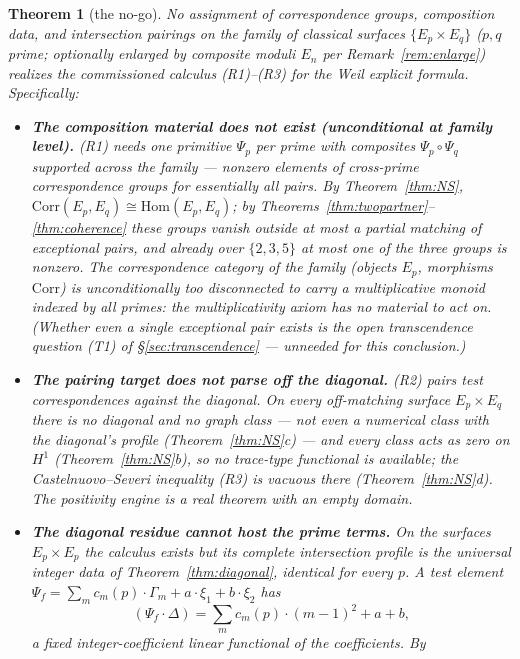 \documentclass[11pt]{article}
\newtheorem{theorem}{Theorem}
\theoremstyle{definition}
\theoremstyle{remark}
\newcommand{\Hom}{\mathrm{Hom}}
\newcommand{\Corr}{\mathrm{Corr}}
\begin{document}
\begin{theorem}[the no-go]
\label{thm:nogo}
No assignment of correspondence groups, composition data, and intersection
pairings on the family of classical surfaces $\{E_p \times E_q\}$ ($p, q$
prime; optionally enlarged by composite moduli $E_n$ per
Remark~\ref{rem:enlarge}) realizes the commissioned calculus
\textup{(R1)}--\textup{(R3)} for the Weil explicit formula. Specifically:
\begin{itemize}
\item[\textup{(O1)}] \textbf{The composition material does not exist
(unconditional at family level).} \textup{(R1)} needs one primitive $\Psi_p$
per prime with composites $\Psi_p \circ \Psi_q$ supported across the
family --- nonzero elements of cross-prime correspondence groups for
essentially all pairs. By Theorem~\ref{thm:NS},
$\Corr(E_p, E_q) \cong \Hom(E_p, E_q)$; by
Theorems~\ref{thm:twopartner}--\ref{thm:coherence} these groups vanish
outside at most a partial matching of exceptional pairs, and already over
$\{2,3,5\}$ at most one of the three groups is nonzero. The correspondence
category of the family (objects $E_p$, morphisms $\Corr$) is unconditionally
too disconnected to carry a multiplicative monoid indexed by all primes: the
multiplicativity axiom has no material to act on. (Whether even a single
exceptional pair exists is the open transcendence question (T1) of
\S\ref{sec:transcendence} --- unneeded for this conclusion.)
\item[\textup{(O2)}] \textbf{The pairing target does not parse off the
diagonal.} \textup{(R2)} pairs test correspondences against the diagonal. On
every off-matching surface $E_p \times E_q$ there is no diagonal and no
graph class --- not even a numerical class with the diagonal's profile
(Theorem~\ref{thm:NS}c) --- and every class acts as zero on $H^1$
(Theorem~\ref{thm:NS}b), so no trace-type functional is available; the
Castelnuovo--Severi inequality \textup{(R3)} is vacuous there
(Theorem~\ref{thm:NS}d). The positivity engine is a real theorem with an
empty domain.
\item[\textup{(O3)}] \textbf{The diagonal residue cannot host the prime
terms.} On the surfaces $E_p \times E_p$ the calculus exists but its
complete intersection profile is the universal integer data of
Theorem~\ref{thm:diagonal}, identical for every $p$. A test element
$\Psi_f = \sum_m c_m(p)\cdot\Gamma_m + a\cdot\xi_1 + b\cdot\xi_2$ has
\[
(\Psi_f \cdot \Delta) = \sum_m c_m(p)\cdot(m-1)^2 + a + b ,
\]
a fixed integer-coefficient linear functional of the coefficients. By

\end{itemize}
\end{theorem}
\end{document}
